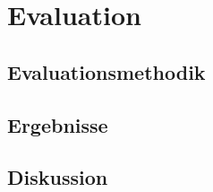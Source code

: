 \chapter{Evaluation}\label{chap:evaluation}

\section{Evaluationsmethodik}\label{sec:evalmethodik}

\section{Ergebnisse}\label{sec:ergebnisse}

\section{Diskussion}\label{sec:diskussion}
